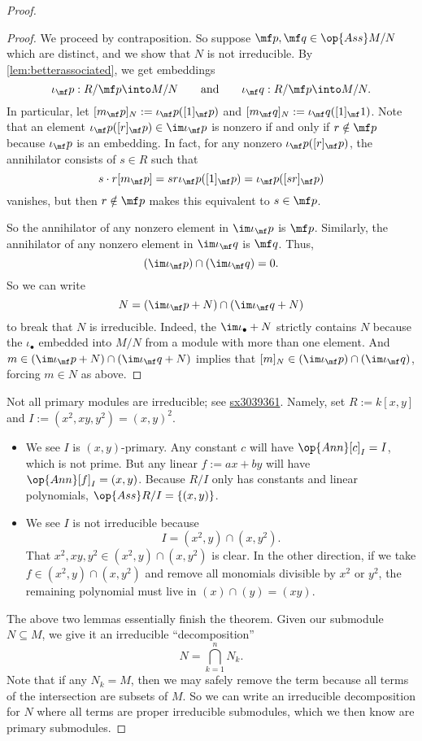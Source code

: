 \begin{proof}
\begin{proof}
		We proceed by contraposition. So suppose $\mf p,\mf q\in\op{Ass}M/N$ which are distinct, and we show that $N$ is not irreducible. By \autoref{lem:betterassociated}, we get embeddings
		\[\iota_\mf p:R/\mf p\into M/N\qquad\text{and}\qquad \iota_\mf q:R/\mf p\into M/N.\]
		In particular, let $[m_\mf p]_N:=\iota_\mf p([1]_\mf p)$ and $[m_\mf q]_N:=\iota_\mf q([1]_\mf 1)$. Note that an element $\iota_\mf p([r]_\mf p)\in\im\iota_\mf p$ is nonzero if and only if $r\notin\mf p$ because $\iota_\mf p$ is an embedding. In fact, for any nonzero $\iota_\mf p([r]_\mf p)$, the annihilator consists of $s\in R$ such that
		\[s\cdot r[m_\mf p]=sr\iota_\mf p([1]_\mf p)=\iota_\mf p([sr]_\mf p)\]
		vanishes, but then $r\notin\mf p$ makes this equivalent to $s\in\mf p$.

		So the annihilator of any nonzero element in $\im\iota_\mf p$ is $\mf p$. Similarly, the annihilator of any nonzero element in $\im\iota_\mf q$ is $\mf q$. Thus,
		\[(\im\iota_\mf p)\cap(\im\iota_\mf q)=0.\]
		So we can write
		\[N=(\im\iota_\mf p+N)\cap(\im\iota_\mf q+N)\]
		to break that $N$ is irreducible. Indeed, the $\im\iota_\bullet+N$ strictly contains $N$ because the $\iota_\bullet$ embedded into $M/N$ from a module with more than one element. And $m\in(\im\iota_\mf p+N)\cap(\im\iota_\mf q+N)$ implies that $[m]_N\in(\im\iota_\mf p)\cap(\im\iota_\mf q)$, forcing $m\in N$ as above.
	\end{proof}
	\begin{remark}
		Not all primary modules are irreducible; see \href{https://math.stackexchange.com/a/3040085/869257}{sx3039361}. Namely, set $R:=k[x,y]$ and $I:=(x^2,xy,y^2)=(x,y)^2$.
		\begin{itemize}
			\item We see $I$ is $(x,y)$-primary. Any constant $c$ will have $\op{Ann}[c]_I=I$, which is not prime. But any linear $f:=ax+by$ will have $\op{Ann}[f]_I=(x,y)$. Because $R/I$ only has constants and linear polynomials, $\op{Ass}R/I=\{(x,y)\}$.
			\item We see $I$ is not irreducible because
			\[I=\left(x^2,y\right)\cap\left(x,y^2\right).\]
			That $x^2,xy,y^2\in\left(x^2,y\right)\cap\left(x,y^2\right)$ is clear. In the other direction, if we take $f\in\left(x^2,y\right)\cap\left(x,y^2\right)$ and remove all monomials divisible by $x^2$ or $y^2$, the remaining polynomial must live in $(x)\cap(y)=(xy)$.
		\end{itemize}
	\end{remark}
	The above two lemmas essentially finish the theorem. Given our submodule $N\subseteq M$, we give it an irreducible ``decomposition''
	\[N=\bigcap_{k=1}^nN_k.\]
	Note that if any $N_k=M$, then we may safely remove the term because all terms of the intersection are subsets of $M$. So we can write an irreducible decomposition for $N$ where all terms are proper irreducible submodules, which we then know are primary submodules.
\end{proof}
